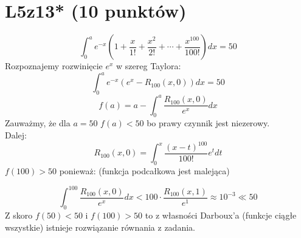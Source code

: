\documentclass{article}
\begin{document}
\section{L5z13* (10 punktów)}
$$
\int_0^a e^{-x} \left (1 + \frac{x}{1!} + \frac{x^2}{2!} + \cdots + \frac{x^{100}}{100!} \right )dx = 50
$$
Rozpoznajemy rozwinięcie $e^x$ w szereg Taylora:
$$
\int_0^a e^{-x} \left (e^x - R_{100}(x,0) \right )dx = 50
$$
$$
f(a) = a - \int_0^a \frac{R_{100}(x,0)}{e^{x}}dx
$$
Zauważmy, że dla $a = 50$ $f(a) < 50$ bo prawy czynnik jest niezerowy.\\Dalej:
$$
R_{100}(x,0) %
 = \int_0^x \frac{(x-t)^{100}}{100!} e^t dt
$$
$f(100) > 50$ ponieważ: (funkcja podcałkowa jest malejąca)

$$
\int_0^{100} \frac{R_{100}(x,0)}{e^{x}}dx < 100 \cdot \frac{R_{100}(x,1)}{e^{1}} \approx 10^{-3} \ll 50
$$
Z skoro $f(50) < 50$ i $f(100) > 50$ to z własności Darboux'a (funkcje ciągłe wszystkie) istnieje rozwiązanie równania z zadania.
\end{document}
